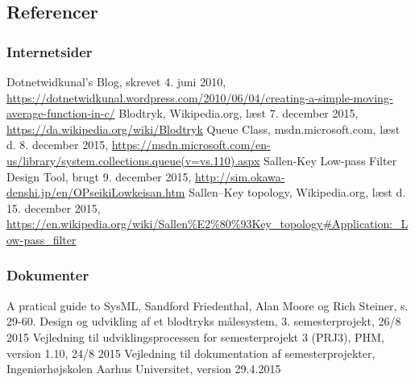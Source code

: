 \begin{thebibliography}{99}
\section{Referencer}
\subsubsection{Internetsider}
Dotnetwidkunal's Blog, skrevet 4. juni 2010,
\url{https://dotnetwidkunal.wordpress.com/2010/06/04/creating-a-simple-moving-average-function-in-c/}
Blodtryk, Wikipedia.org, læst 7. december 2015, \url{https://da.wikipedia.org/wiki/Blodtryk}
Queue Class, msdn.microsoft.com, læst d. 8. december 2015, \url{https://msdn.microsoft.com/en-us/library/system.collections.queue(v=vs.110).aspx}
Sallen-Key Low-pass Filter Design Tool, brugt 9. december 2015, \url{http://sim.okawa-denshi.jp/en/OPseikiLowkeisan.htm}
Sallen–Key topology, Wikipedia.org, læst d. 15. december 2015, \url{https://en.wikipedia.org/wiki/Sallen\%E2\%80\%93Key_topology#Application:_Low-pass_filter}
\subsubsection{Dokumenter}
A pratical guide to SysML, Sandford Friedenthal, Alan Moore og Rich Steiner, s. 29-60.
Design og udvikling af et blodtryks målesystem, 3. semesterprojekt, 26/8 2015
Vejledning til udviklingsprocessen for semesterprojekt 3 (PRJ3), PHM, version 1.10, 24/8 2015
Vejledning til dokumentation af semesterprojekter, Ingeniørhøjskolen Aarhus Universitet, version 29.4.2015
\end{thebibliography}